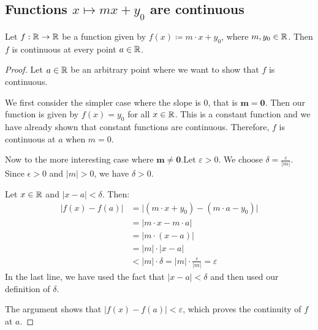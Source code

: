 \subsection{Functions $x \mapsto mx + y_0$ are continuous}

\begin{theorem}
   Let $f: \mathbb{R} \to \mathbb{R}$ be a function given by $f(x) \coloneqq m \cdot x + y_0$, where $m, y_0 \in \mathbb{R}$. Then $f$ is continuous at every point $a \in \mathbb{R}$.
\end{theorem}

\begin{proof}
   Let $a \in \mathbb{R}$ be an arbitrary point where we want to show that $f$ is continuous.

   We first consider the simpler case where the slope is $0$, that is $\mathbf{m = 0}$. Then our function is given by $f(x) = y_0$ for all $x \in \mathbb{R}$. This is a constant function and we have already shown that constant functions are continuous. Therefore, $f$ is continuous at $a$ when $m = 0$.

   Now to the more interesting case where $\mathbf{m \neq 0}$.Let $\varepsilon > 0$. We choose $\delta = \frac{\varepsilon}{|m|}$. Since $\epsilon > 0$ and $|m| > 0$, we have $\delta > 0$.

   Let $x \in \mathbb{R}$ and $|x-a| < \delta$. Then:
   \begin{align*}
      |f(x) - f(a)| &= \bigl|(m \cdot x + y_0) - (m \cdot a - y_0)\bigr| \\
      &= |m \cdot x - m \cdot a| \\
      &= |m \cdot (x - a)| \\
      &= |m| \cdot |x - a| \\
      &< |m| \cdot \delta
      = |m| \cdot \frac{\varepsilon}{|m|} = \varepsilon
   \end{align*}
   In the last line, we have used the fact that $|x - a| < \delta$ and then used our definition of $\delta$.

   The argument shows that $|f(x) - f(a)| < \varepsilon$, which proves the continuity of $f$ at $a$.
\end{proof}

